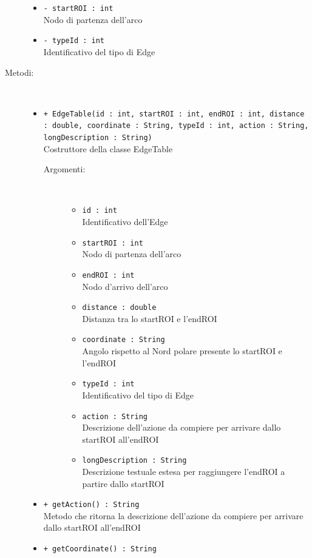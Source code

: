 \documentclass[../DefinizioneDiProdotto.tex]{subfiles}
\begin{document}
\begin{description}
\begin{itemize}
\item \texttt{- startROI : int}\\
Nodo di partenza dell'arco

\item \texttt{- typeId : int}\\
Identificativo del tipo di Edge

\end{itemize}
\item[Metodi:] \
\begin{itemize}
\item \texttt{+ EdgeTable(id : int, startROI : int, endROI : int, distance : double, coordinate : String, typeId : int, action : String, longDescription : String)}\\
Costruttore della classe EdgeTable
 \begin{description}
\item[Argomenti:] \
\begin{itemize}
\item \texttt{id : int}\\
Identificativo dell'Edge\item \texttt{startROI : int}\\
Nodo di partenza dell'arco\item \texttt{endROI : int}\\
Nodo d'arrivo dell'arco\item \texttt{distance : double}\\
Distanza tra lo startROI e l'endROI\item \texttt{coordinate : String}\\
Angolo rispetto al Nord polare presente lo startROI e l'endROI\item \texttt{typeId : int}\\
Identificativo del tipo di Edge\item \texttt{action : String}\\
Descrizione dell'azione da compiere per arrivare dallo startROI all'endROI\item \texttt{longDescription : String}\\
Descrizione testuale estesa per raggiungere l'endROI a partire dallo startROI\end{itemize}
\end{description}
\item \texttt{+ getAction() : String}\\
Metodo che ritorna la descrizione dell'azione da compiere per arrivare dallo startROI all'endROI
 \item \texttt{+ getCoordinate() : String}\\

\end{itemize}
\end{description}
\end{document}
